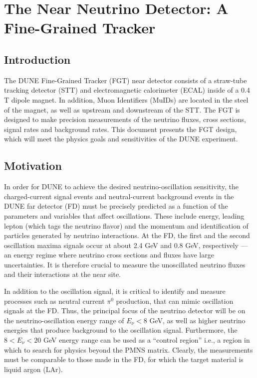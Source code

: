
\chapter{The Near Neutrino Detector: A Fine-Grained Tracker}
\label{ch:nd-nnd}

\section{Introduction} 
\label{sec:nd-nnd-intro}

The DUNE Fine-Grained Tracker (FGT) near detector consists of a straw-tube
tracking detector (STT) and electromagnetic calorimeter (ECAL) inside of a 0.4 T
dipole magnet. In addition, Muon Identifiers (MuIDs) are located in the
steel of the magnet, as well as upstream and downstream of the STT. The FGT
is designed to make precision measurements of the neutrino fluxes, 
cross sections, signal rates and background rates. 
This document presents 
the FGT design, which 
will meet the physics goals and sensitivities of the DUNE experiment. 

\section{Motivation}
\label{sec:nd-nnd-motivation}

In order for DUNE to achieve the desired neutrino-oscillation sensitivity, the 
charged-current signal events and neutral-current
background events in the DUNE far detector (FD) must be precisely 
predicted as a function of the parameters and variables that affect 
oscillations. These include energy, leading lepton (which tags the neutrino flavor) and the 
momentum and identification of particles generated by neutrino interactions. 
At the FD, the first and the second 
oscillation maxima signals occur at about 2.4 GeV and 0.8 GeV, respectively 
--- an energy regime where neutrino cross sections and fluxes have large 
uncertainties. It is therefore crucial to measure the unoscillated neutrino fluxes and 
their interactions at the near site. 

In addition to the oscillation signal, it is 
critical to identify and measure processes such as neutral current $\pi^0$ production,
that can mimic oscillation signals 
at the FD. Thus, the principal focus of the neutrino detector will be 
on the neutrino-oscillation energy range of $E_\nu < 8$ GeV, as well as higher 
neutrino energies that produce background to the oscillation signal. Furthermore, the
$8<E_\nu < 20$ GeV energy range can be used as a ``control region'' %
i.e., a region in which 
to search for physics beyond the PMNS matrix. Clearly, 
the measurements must be 
comparable to those made in the FD, for which the target material is liquid argon (LAr). 

